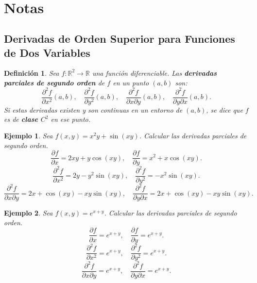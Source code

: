\documentclass[11pt]{book}
\theoremstyle{definicion}
\newtheorem{definicion}{Definición}[section]
\theoremstyle{teorema}
\theoremstyle{ejemplo}
\newtheorem{ejemplo}{Ejemplo}[section]
\begin{document}


\section{Notas}

\subsection{Derivadas de Orden Superior para Funciones de Dos Variables}

\begin{definicion}
    Sea \( f: \mathbb{R}^2 \to \mathbb{R} \) una función diferenciable. Las \textbf{derivadas parciales de segundo orden} de \( f \) en un punto \( (a, b) \) son:
    \[
    \frac{\partial^2 f}{\partial x^2}(a, b), \quad \frac{\partial^2 f}{\partial y^2}(a, b), \quad \frac{\partial^2 f}{\partial x \partial y}(a, b), \quad \frac{\partial^2 f}{\partial y \partial x}(a, b).
    \]
    Si estas derivadas existen y son continuas en un entorno de \( (a, b) \), se dice que \( f \) es de \textbf{clase \( C^2 \)} en ese punto.
\end{definicion}

\begin{ejemplo}
    Sea \( f(x, y) = x^2 y + \sin(xy) \). Calcular las derivadas parciales de segundo orden.
    \[
    \frac{\partial f}{\partial x} = 2xy + y \cos(xy), \quad \frac{\partial f}{\partial y} = x^2 + x \cos(xy).
    \]
    \[
    \frac{\partial^2 f}{\partial x^2} = 2y - y^2 \sin(xy), \quad \frac{\partial^2 f}{\partial y^2} = -x^2 \sin(xy).
    \]
    \[
    \frac{\partial^2 f}{\partial x \partial y} = 2x + \cos(xy) - xy \sin(xy), \quad \frac{\partial^2 f}{\partial y \partial x} = 2x + \cos(xy) - xy \sin(xy).
    \]
\end{ejemplo}

\begin{ejemplo}
    Sea \( f(x, y) = e^{x+y} \). Calcular las derivadas parciales de segundo orden.
    \[
    \frac{\partial f}{\partial x} = e^{x+y}, \quad \frac{\partial f}{\partial y} = e^{x+y}.
    \]
    \[
    \frac{\partial^2 f}{\partial x^2} = e^{x+y}, \quad \frac{\partial^2 f}{\partial y^2} = e^{x+y}.
    \]
    \[
    \frac{\partial^2 f}{\partial x \partial y} = e^{x+y}, \quad \frac{\partial^2 f}{\partial y \partial x} = e^{x+y}.
    \]
\end{ejemplo}
\end{document}

